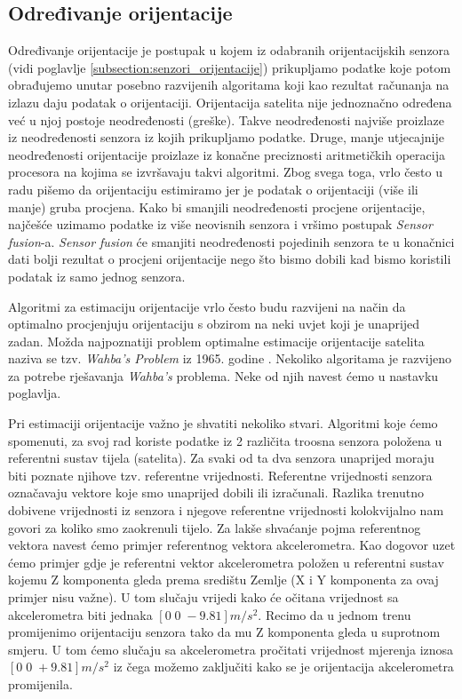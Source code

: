 \documentclass[times, utf8, diplomski, numeric]{templates/template}
\begin{document}
{{        \subsection{Određivanje orijentacije}{
        \label{subsection:odredjivanje_orijentacije}
            Određivanje orijentacije je postupak u kojem iz odabranih orijentacijskih senzora (vidi poglavlje \ref{subsection:senzori_orijentacije}) prikupljamo podatke koje potom obrađujemo unutar posebno razvijenih algoritama koji kao rezultat računanja na izlazu daju podatak o orijentaciji. Orijentacija satelita nije jednoznačno određena već u njoj postoje neodređenosti (greške). Takve neodređenosti najviše proizlaze iz neodređenosti senzora iz kojih prikupljamo podatke. Druge, manje utjecajnije neodređenosti orijentacije proizlaze iz konačne preciznosti aritmetičkih operacija procesora na kojima se izvršavaju takvi algoritmi. Zbog svega toga, vrlo često u radu pišemo da orijentaciju estimiramo jer je podatak o orijentaciji (više ili manje) gruba procjena. Kako bi smanjili neodređenosti procjene orijentacije, najčešće uzimamo podatke iz više neovisnih senzora i vršimo postupak \emph{Sensor fusion}-a. \emph{Sensor fusion} će smanjiti neodređenosti pojedinih senzora te u konačnici dati bolji rezultat o procjeni orijentacije nego što bismo dobili kad bismo koristili podatak iz samo jednog senzora.

            Algoritmi za estimaciju orijentacije vrlo često budu razvijeni na način da optimalno procjenjuju orijentaciju s obzirom na neki uvjet koji je unaprijed zadan. Možda najpoznatiji problem optimalne estimacije orijentacije satelita naziva se tzv. \emph{Wahba's Problem} iz 1965. godine \cite{wahbas_problem}. Nekoliko algoritama je razvijeno za potrebe rješavanja \emph{Wahba's} problema. Neke od njih navest ćemo u nastavku poglavlja.

            Pri estimaciji orijentacije važno je shvatiti nekoliko stvari. Algoritmi koje ćemo spomenuti, za svoj rad koriste podatke iz 2 različita troosna senzora položena u referentni sustav tijela (satelita). Za svaki od ta dva senzora unaprijed moraju biti poznate njihove tzv. referentne vrijednosti. Referentne vrijednosti senzora označavaju vektore koje smo unaprijed dobili ili izračunali. Razlika trenutno dobivene vrijednosti iz senzora i njegove referentne vrijednosti kolokvijalno nam govori za koliko smo zaokrenuli tijelo. Za lakše shvaćanje pojma referentnog vektora navest ćemo primjer referentnog vektora akcelerometra. Kao dogovor uzet ćemo primjer gdje je referentni vektor akcelerometra položen u referentni sustav kojemu Z komponenta gleda prema središtu Zemlje (X i Y komponenta za ovaj primjer nisu važne). U tom slučaju vrijedi kako će očitana vrijednost sa akcelerometra biti jednaka $\left[0 \; 0 \; -9.81\right] m/s^2$. Recimo da u jednom trenu promijenimo orijentaciju senzora tako da mu Z komponenta gleda u suprotnom smjeru. U tom ćemo slučaju sa akcelerometra pročitati vrijednost mjerenja iznosa $\left[0 \; 0 \; +9.81\right] m/s^2$ iz čega možemo zaključiti kako se je orijentacija akcelerometra promijenila.

}}}
\end{document}
